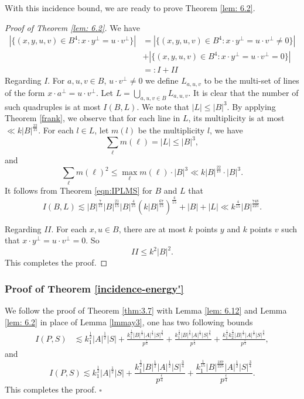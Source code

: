 \documentclass[11pt]{article}
\def\l({\left(}
\def\r){\right)}
\def\lv{\left\vert}
\def\rv{\right\vert}
\begin{document}
With this incidence bound, we are ready to prove Theorem \ref{lem: 6.2}.
\begin{proof}[Proof of Theorem \ref{lem: 6.2}]
We have
\begin{align*}
    \lv \{(x,y,u,v) \in B^4 \colon x\cdot y^\perp =u\cdot v^\perp \}\rv & = \lv \{(x,y,u,v) \in B^4 \colon x\cdot y^\perp =u\cdot v^\perp \ne 0\}\rv \\&+\lv \{(x,y,u,v) \in B^4 \colon x\cdot y^\perp =u\cdot v^\perp =0\}\rv \\
    & =: I +II
\end{align*}
Regarding $I$. For $a, u, v\in B$, $u\cdot v^\perp \ne 0$ we define $L_{a, u, v}$ to be the multi-set of lines of the form $x\cdot a^\perp=u\cdot v^\perp$. Let $L=\bigcup_{a, u, v\in B}L_{a, u, v}$. It is clear that the number of such quadruples is at most $I(B, L)$. We note that $|L|\le |B|^3$. By applying Theorem \ref{frank}, we observe that for each line in $L$, its multiplicity is at most $\ll k|B|^{\frac{22}{15}}$. For each $l \in L$, let $m(l)$ be the multiplicity $l$, we have
\[\sum_{\ell}m(\ell)=|L|\le |B|^3,\]
and 
\[\sum_{\ell}m(\ell)^2\le \max_{\ell}m(\ell)\cdot |B|^3\ll k|B|^{\frac{22}{15}}\cdot |B|^3.\]
It follows from Theorem \ref{eqn:IPLMS} for $B$ and $L$ that
\[ I(B,L) \lesssim \lv B\rv^{\frac{7}{15}} \lv B\rv^{\frac{21}{15}}\lv B\rv^{\frac{4}{15}}\l(  k\lv B\rv^{\frac{67}{15}} \r)^{\frac{4}{15}} +\lv B\rv +\lv L\rv \ll k^{\frac{4}{15}} \lv B\rv^{\frac{748}{225}}. \]

Regarding $II$. For each $x,u\in B$, there are at most $k$ points $y$ and $k$ points $v$ such that $x\cdot y^\perp =u\cdot v^\perp =0$. So 
\[ II \le k^2\lv B\rv^{2}. \]
This completes the proof.
\end{proof}

\subsubsection*{Proof of Theorem \ref{incidence-energy'}}
We follow the proof of Theorem \ref{thm:3.7} with Lemma \ref{lem: 6.12} and Lemma \ref{lem: 6.2} in place of Lemma \ref{lmmay3}, one has two following bounds
\begin{align*} I(P,S) &\lesssim  k_1^{\frac{1}{2}}|A|^{\frac{1}{2}}|S|+  \frac{k_1^{\frac{1}{2}}\lv B\rv^{\frac{1}{2}}|A|^{\frac{1}{2}}|S|^{\frac{3}{4}}}{p^{\frac{\epsilon}{4}}} + \frac{k_1^{\frac{1}{8}}\lv B\rv^{\frac{3}{4}}|A|^{\frac{1}{2}} |S|^{\frac{3}{4}}}{p^{\frac{\epsilon}{4}}}+\frac{k_1^{\frac{1}{4}}k_2^{\frac{1}{4}}\lv B\rv^{\frac{1}{2}} |A|^{\frac{1}{2}}|S|^{\frac{3}{4}}}{p^{\frac{\epsilon}{4}}},
\end{align*}
and 
\[ I(P,S) \lesssim  k_1^{\frac{1}{2}}|A|^{\frac{1}{2}}|S|+  \frac{k_1^{\frac{1}{2}}\lv B\rv^{\frac{1}{2}}|A|^{\frac{1}{2}}|S|^{\frac{3}{4}}}{p^{\frac{\epsilon}{4}}}+\frac{k_1^{\frac{1}{15}}|B|^{\frac{187}{225}} |A|^{\frac{1}{2}} |S|^{\frac{3}{4}}}{p^{\frac{\epsilon}{4}}}.\]
This completes the proof. $\square$
\end{document}
